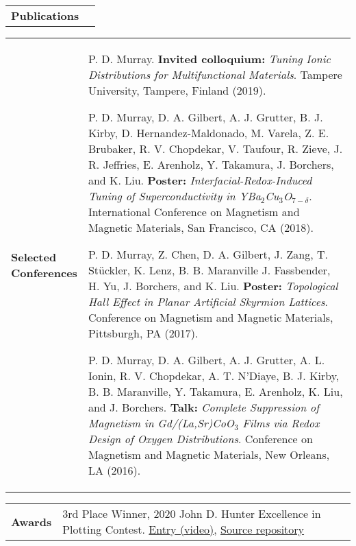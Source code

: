 \documentclass[10pt,letterpaper]{article}
\newcommand{\coll}{1.2}
\newcommand{\colr}{8}
\begin{document}
\vspace{-0.5cm}
\begin{longtabu} to \textwidth{X[\coll] X[\colr]}
    \textbf{Publications} & \vspace{-0.55cm}\printbibliography[heading=none]
\end{longtabu}
\vspace{-0.5cm}
\begin{longtabu} to \textwidth{X[\coll] X[\colr]}
    \textbf{Selected \newline Conferences} & P. D. Murray. \textbf{Invited colloquium:} \emph{Tuning Ionic Distributions for Multifunctional Materials}. Tampere University, Tampere, Finland (2019). \newline

    P. D. Murray, D. A. Gilbert, A. J. Grutter, B. J. Kirby, D. Hernandez-Maldonado, M. Varela, Z. E. Brubaker, R. V. Chopdekar, V. Taufour, R. Zieve, J. R. Jeffries, E. Arenholz, Y. Takamura, J. Borchers, and K. Liu. \textbf{Poster:} \emph{Interfacial-Redox-Induced Tuning of Superconductivity in YBa$_2$Cu$_3$O$_{7-\delta}$}. International Conference on Magnetism and Magnetic Materials, San Francisco, CA (2018). \newline

    P. D. Murray, Z. Chen, D. A. Gilbert, J. Zang, T. Stückler, K. Lenz, B. B. Maranville J. Fassbender, H. Yu, J. Borchers, and K. Liu. \textbf{Poster:} \emph{Topological Hall Effect in Planar Artificial Skyrmion Lattices}. Conference on Magnetism and Magnetic Materials, Pittsburgh, PA (2017). \newline

    P. D. Murray, D. A. Gilbert, A. J. Grutter, A. L. Ionin, R. V. Chopdekar, A. T. N’Diaye, B. J. Kirby, B. B. Maranville, Y. Takamura, E. Arenholz, K. Liu, and J. Borchers. \textbf{Talk:} \emph{Complete Suppression of Magnetism in Gd/(La,Sr)CoO$_3$ Films via Redox Design of Oxygen Distributions}. Conference on Magnetism and Magnetic Materials, New Orleans, LA (2016). \newline
\end{longtabu}
\vspace{-0.5cm}
\begin{longtabu} to \textwidth{X[\coll] X[\colr]}
    \textbf{Awards} & 3rd Place Winner, 2020 John D. Hunter Excellence in Plotting Contest. \href{https://www.youtube.com/watch?v=cBPwU2T46vw}{Entry (video)}, \href{https://github.com/peytondmurray/jdh2020}{Source repository}
\end{longtabu}
\end{document}
